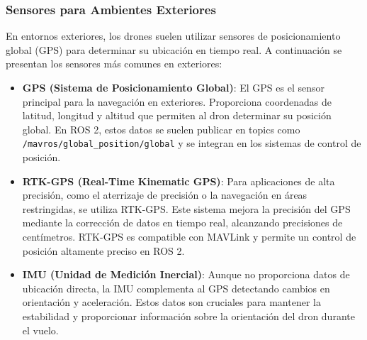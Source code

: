     \subsubsection{Sensores para Ambientes Exteriores}
    En entornos exteriores, los drones suelen utilizar sensores de posicionamiento global (GPS) para determinar su ubicación en tiempo real. A continuación se presentan los sensores más comunes en exteriores:
        \begin{itemize}
            \item \textbf{GPS (Sistema de Posicionamiento Global)}: El GPS es el sensor principal para la navegación en exteriores. Proporciona coordenadas de latitud, longitud y altitud que permiten al dron determinar su posición global. En ROS 2, estos datos se suelen publicar en topics como \texttt{/mavros/global\_position/global} y se integran en los sistemas de control de posición.
            
            \item \textbf{RTK-GPS (Real-Time Kinematic GPS)}: Para aplicaciones de alta precisión, como el aterrizaje de precisión o la navegación en áreas restringidas, se utiliza RTK-GPS. Este sistema mejora la precisión del GPS mediante la corrección de datos en tiempo real, alcanzando precisiones de centímetros. RTK-GPS es compatible con MAVLink y permite un control de posición altamente preciso en ROS 2.
            
            \item \textbf{IMU (Unidad de Medición Inercial)}: Aunque no proporciona datos de ubicación directa, la IMU complementa al GPS detectando cambios en orientación y aceleración. Estos datos son cruciales para mantener la estabilidad y proporcionar información sobre la orientación del dron durante el vuelo.
        \end{itemize}
    
